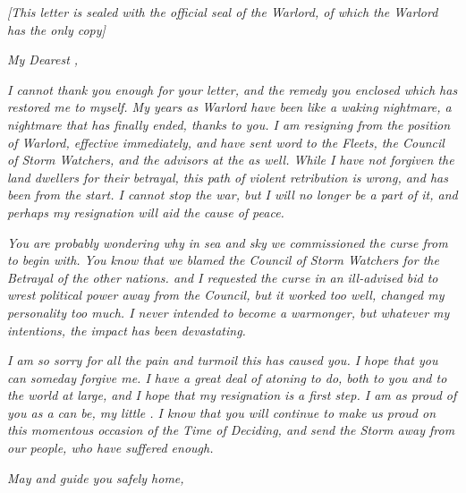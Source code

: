 \documentclass[white]{GL2020}
\begin{document}
\name{\wWarlordResignationOfficial{}}

\emph{[This letter is sealed with the official seal of the Warlord, of which the Warlord has the only copy]}

\vspace{1cm}

\textsl{My Dearest \cWarlordDaughter{},}

\vspace{0.5cm}

\textsl{I cannot thank you enough for your letter, and the remedy you enclosed which has restored me to myself. My years as Warlord have been like a waking nightmare, a nightmare that has finally ended, thanks to you. I am resigning from the position of Warlord, effective immediately, and have sent word to the Fleets, the Council of Storm Watchers, and the \pShip{} advisors at the \pSc{} as well. While I have not forgiven the land dwellers for their betrayal, this path of violent retribution is wrong, and has been from the start. I cannot stop the war, but I will no longer be a part of it, and perhaps my resignation will aid the cause of peace.}

\textsl{You are probably wondering why in sea and sky we commissioned the curse from \cCurse{\full} to begin with. You know that we blamed the Council of Storm Watchers for the Betrayal of the other nations. \cQuiet{} and I requested the curse in an ill-advised bid to wrest political power away from the Council, but it worked too well, changed my personality too much. I never intended to become a warmonger, but whatever my intentions, the impact has been devastating.}

\textsl{I am so sorry for all the pain and turmoil this has caused you. I hope that you can someday forgive me. I have a great deal of atoning to do, both to you and to the world at large, and I hope that my resignation is a first step. I am as proud of you as a \cLoud{\parent} can be, my little \cWarlordDaughter{}. I know that you will continue to make us proud on this momentous occasion of the Time of Deciding, and send the Storm away from our people, who have suffered enough.}

\vspace{0.5cm}

\textsl{May \cEbb{} and \cFlow{} guide you safely home,}
\textsl{\cLoud{\full}}
\end{document}
